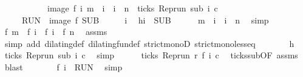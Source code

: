 \begin{isabellebody}
\ \ \ \ \ \ \ \ \ \ {\isacharequal}\ image\ f\ {\isacharbraceleft}i{\isachardot}\ m\ {\isasymle}\ i\ {\isasymand}\ i\ {\isacharless}\ n\ {\isasymand}\ ticks\ {\isacharparenleft}{\isacharparenleft}Rep{\isacharunderscore}run\ sub{\isacharparenright}\ i\ c{\isacharparenright}{\isacharbraceright}{\isacartoucheclose}\isanewline
\ \ \ \ {\isacharparenleft}\ {\isacartoucheopen}{\isacharquery}RUN\ {\isacharequal}\ image\ f\ {\isacharquery}SUB{\isacartoucheclose}{\isacharparenright}\isanewline
%
\isadelimproof
%
\endisadelimproof
%
\isatagproof
{}\isamarkupfalse%
\isanewline
\ \ \isacommand{{\isacharbraceleft}}\isamarkupfalse%
\ \isamarkupfalse%
\ i\ \isamarkupfalse%
\ h{\isacharcolon}{\isacartoucheopen}i\ {\isasymin}\ {\isacharquery}SUB{\isacartoucheclose}\isanewline
\ \ \ \ \isamarkupfalse%
\ {\isacartoucheopen}m\ {\isasymle}\ i\ {\isasymand}\ i\ {\isacharless}\ n{\isacartoucheclose}\ \isamarkupfalse%
\ simp\isanewline
\ \ \ \ \isamarkupfalse%
\ {\isacartoucheopen}f\ m\ {\isasymle}\ f\ i\ {\isasymand}\ f\ i\ {\isacharless}\ {\isacharparenleft}f\ n{\isacharparenright}{\isacartoucheclose}\ \isamarkupfalse%
\ assms\isanewline
\ \ \ \ \ \ \isamarkupfalse%
\ {\isacharparenleft}simp\ add{\isacharcolon}\ dilating{\isacharunderscore}def\ dilating{\isacharunderscore}fun{\isacharunderscore}def\ strict{\isacharunderscore}monoD\ strict{\isacharunderscore}mono{\isacharunderscore}less{\isacharunderscore}eq{\isacharparenright}\isanewline
\ \ \ \ \isamarkupfalse%
\ \isamarkupfalse%
\ h\ \isamarkupfalse%
\ {\isacartoucheopen}ticks\ {\isacharparenleft}{\isacharparenleft}Rep{\isacharunderscore}run\ sub{\isacharparenright}\ i\ c{\isacharparenright}{\isacartoucheclose}\ \isamarkupfalse%
\ simp\isanewline
\ \ \ \ \isamarkupfalse%
\ {\isacartoucheopen}ticks\ {\isacharparenleft}{\isacharparenleft}Rep{\isacharunderscore}run\ r{\isacharparenright}\ {\isacharparenleft}f\ i{\isacharparenright}\ c{\isacharparenright}{\isacartoucheclose}\ \isamarkupfalse%
\ ticks{\isacharunderscore}sub{\isacharbrackleft}OF\ assms{\isacharbrackright}\ \isamarkupfalse%
\ blast\isanewline
\ \ \ \ \isamarkupfalse%
\ \isamarkupfalse%
\ {\isacartoucheopen}f\ i\ {\isasymin}\ {\isacharquery}RUN{\isacartoucheclose}\ \isamarkupfalse%
\ simp\isanewline
\ \ \isacommand{{\isacharbraceright}}\isamarkupfalse%

\end{isabellebody}
